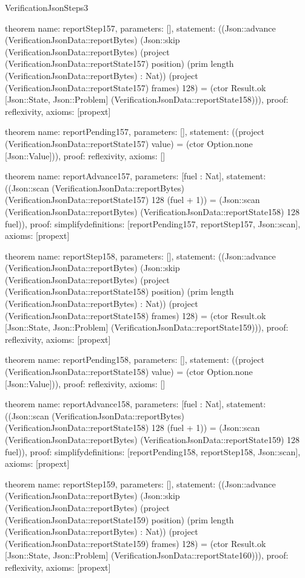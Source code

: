 \begin{lexlean}{VerificationJsonSteps3}
\begin{semanticmodule}
theorem{
  name: reportStep157,
  parameters: [],
  statement: ((Json::advance (VerificationJsonData::reportBytes) (Json::skip (VerificationJsonData::reportBytes) (project (VerificationJsonData::reportState157) position) (prim length (VerificationJsonData::reportBytes) : Nat)) (project (VerificationJsonData::reportState157) frames) 128) = (ctor Result.ok [Json::State, Json::Problem] (VerificationJsonData::reportState158))),
  proof: reflexivity{},
  axioms: [propext]
}

theorem{
  name: reportPending157,
  parameters: [],
  statement: ((project (VerificationJsonData::reportState157) value) = (ctor Option.none [Json::Value])),
  proof: reflexivity{},
  axioms: []
}

theorem{
  name: reportAdvance157,
  parameters: [fuel : Nat],
  statement: ((Json::scan (VerificationJsonData::reportBytes) (VerificationJsonData::reportState157) 128 (fuel + 1)) = (Json::scan (VerificationJsonData::reportBytes) (VerificationJsonData::reportState158) 128 fuel)),
  proof: simplify{definitions: [reportPending157, reportStep157, Json::scan]},
  axioms: [propext]
}

theorem{
  name: reportStep158,
  parameters: [],
  statement: ((Json::advance (VerificationJsonData::reportBytes) (Json::skip (VerificationJsonData::reportBytes) (project (VerificationJsonData::reportState158) position) (prim length (VerificationJsonData::reportBytes) : Nat)) (project (VerificationJsonData::reportState158) frames) 128) = (ctor Result.ok [Json::State, Json::Problem] (VerificationJsonData::reportState159))),
  proof: reflexivity{},
  axioms: [propext]
}

theorem{
  name: reportPending158,
  parameters: [],
  statement: ((project (VerificationJsonData::reportState158) value) = (ctor Option.none [Json::Value])),
  proof: reflexivity{},
  axioms: []
}

theorem{
  name: reportAdvance158,
  parameters: [fuel : Nat],
  statement: ((Json::scan (VerificationJsonData::reportBytes) (VerificationJsonData::reportState158) 128 (fuel + 1)) = (Json::scan (VerificationJsonData::reportBytes) (VerificationJsonData::reportState159) 128 fuel)),
  proof: simplify{definitions: [reportPending158, reportStep158, Json::scan]},
  axioms: [propext]
}

theorem{
  name: reportStep159,
  parameters: [],
  statement: ((Json::advance (VerificationJsonData::reportBytes) (Json::skip (VerificationJsonData::reportBytes) (project (VerificationJsonData::reportState159) position) (prim length (VerificationJsonData::reportBytes) : Nat)) (project (VerificationJsonData::reportState159) frames) 128) = (ctor Result.ok [Json::State, Json::Problem] (VerificationJsonData::reportState160))),
  proof: reflexivity{},
  axioms: [propext]
}


\end{semanticmodule}
\end{lexlean}
